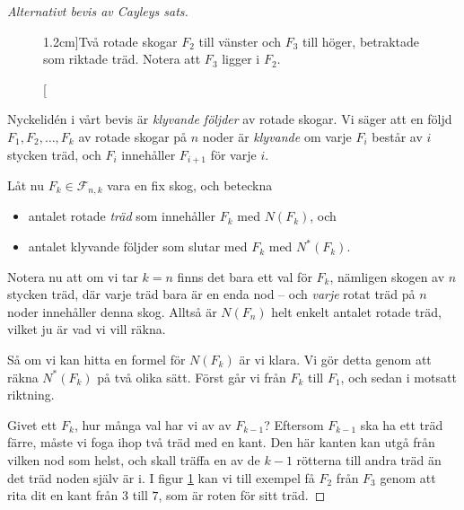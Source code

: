 \documentclass[nobib]{tufte-handout}
\begin{document}
\begin{proof}[Alternativt bevis av Cayleys sats]
\begin{figure}

        
        \caption[][1.2cm]{Två rotade skogar $F_2$ till vänster och $F_3$ till höger, betraktade som riktade träd. Notera att $F_3$ ligger i $F_2$.}
        \label{fig:two_rooted_forests}
    \end{figure}

    Nyckelidén i vårt bevis är \emph{klyvande följder} av rotade skogar. Vi säger att en följd $F_1, F_2,\ldots, F_k$ av rotade skogar på $n$ noder är \emph{klyvande} om varje $F_i$ består av $i$ stycken träd, och $F_{i}$ innehåller $F_{i+1}$ för varje $i$.

    Låt nu $F_k \in \mathcal{F}_{n,k}$ vara en fix skog, och beteckna
    \begin{itemize}
        \item antalet rotade \emph{träd} som innehåller $F_k$ med $N(F_k)$, och
        \item antalet klyvande följder som slutar med $F_k$ med $N^*(F_k)$.
    \end{itemize}

    Notera nu att om vi tar $k = n$ finns det bara ett val för $F_k$, nämligen skogen av $n$ stycken träd, där varje träd bara är en enda nod -- och \emph{varje} rotat träd på $n$ noder innehåller denna skog. Alltså är $N(F_n)$ helt enkelt antalet rotade träd, vilket ju är vad vi vill räkna.

    Så om vi kan hitta en formel för $N(F_k)$ är vi klara. Vi gör detta genom att räkna $N^*(F_k)$ på två olika sätt. Först går vi från $F_k$ till $F_1$, och sedan i motsatt riktning.

    Givet ett $F_k$, hur många val har vi av av $F_{k-1}$? Eftersom $F_{k-1}$ ska ha ett träd färre, måste vi foga ihop två träd med en kant. Den här kanten kan utgå från vilken nod som helst, och skall träffa en av de $k-1$ rötterna till andra träd än det träd noden själv är i. I figur \ref{fig:two_rooted_forests} kan vi till exempel få $F_2$ från $F_3$ genom att rita dit en kant från $3$ till $7$, som är roten för sitt träd.


\end{proof}
\end{document}

